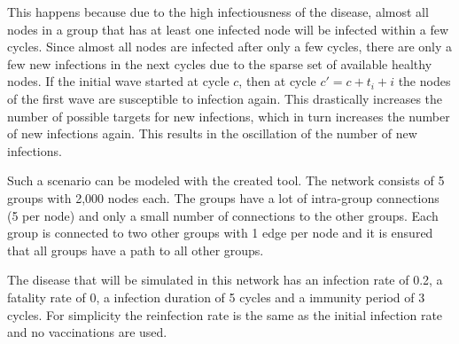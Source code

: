 This happens because due to the high infectiousness of the disease, almost all nodes in 
a group that has at least one infected node will be infected within a few cycles. Since
almost all nodes are infected after only a few cycles, there are only a few new infections 
in the next cycles due to the sparse set of available healthy nodes. If the initial
wave started at cycle $c$, then at cycle $c' = c + t_i + i$ the nodes of the first wave 
are susceptible to infection again. This drastically increases the number of possible targets for new infections, which in turn increases the number of new infections again. This results in 
the oscillation of the number of new infections.

Such a scenario can be modeled with the created tool. The network consists of 5 groups with 2,000 nodes each. The groups have a lot of intra-group connections (5 per node) and only a small number of connections to the
other groups. Each group is connected to two other groups with 1 edge per node and it is ensured that
all groups have a path to all other groups.

The disease that will be simulated in this network has an infection rate of 0.2, a fatality
rate of 0, a infection duration of 5 cycles and a immunity period of 3 cycles. 
\clearpage For simplicity the reinfection rate is the same as the initial infection rate and no vaccinations are used.

